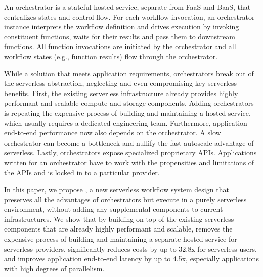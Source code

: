 An orchestrator is a stateful hosted service, separate from FaaS and BaaS,
that centralizes states and control-flow. For each workflow invocation, an
orchestrator instance interprets the workflow definition and drives execution
by invoking constituent functions, waits for their results and pass them to
downstream functions. All function invocations are initiated by the
orchestrator and all workflow states (e.g., function results) flow through the
orchestrator.

While a solution that meets application requirements, orchestrators break out
of the serverless abstraction, neglecting and even compromising key serverless
benefits. First, the existing serverless infrastructure already provides
highly performant and scalable compute and storage components. Adding
orchestrators is repeating the expensive process of building and maintaining a
hosted service, which usually requires a dedicated engineering team.
Furthermore, application end-to-end performance now also depends on the
orchestrator. A slow orchestrator can become a bottleneck and nullify the fast
autoscale advantage of serverless. Lastly, orchestrators expose specialized
proprietary APIs. Applications written for an orchestrator have to work with
the propensities and limitations of the APIs and is locked in to a particular
provider. 

In this paper, we propose \name{}, a new serverless workflow system design
that preserves all the advantages of orchestrators but execute in a purely
serverless environment, without adding any supplemental components to current
infrastructures. We show that by building on top of the existing serverless
components that are already highly performant and scalable, \name{} removes
the expensive process of building and maintaining a separate hosted service
for serverless providers, significantly reduces costs by up to 32.8x for
serverless users, and improves application end-to-end latency by up to 4.5x,
especially applications with high degrees of parallelism.



